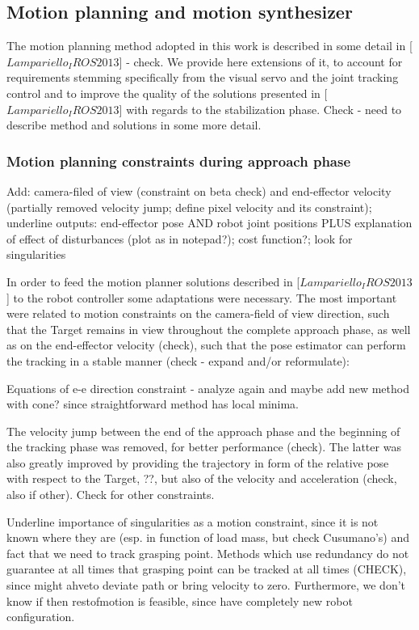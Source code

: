 \subsection{Motion planning and motion synthesizer}
%
The motion planning method adopted in this work is described in some detail in [$Lampariello_IROS2013$] - check. We provide here extensions of it, to account for requirements stemming specifically from the visual servo and the joint tracking control and to improve the quality of the solutions presented in [$Lampariello_IROS2013$] with regards to the stabilization phase. Check - need to describe method and solutions in some more detail.

\subsubsection{Motion planning constraints during approach phase}
%

Add: camera-filed of view (constraint on beta check) and end-effector velocity (partially removed velocity jump; define pixel velocity and its constraint); underline outputs: end-effector pose AND robot joint positions PLUS explanation of effect of disturbances (plot as in notepad?); cost function?; look for singularities

In order to feed the motion planner solutions described in [$Lampariello_IROS2013$] to the robot controller some adaptations were necessary. The most important were related to motion constraints on the camera-field of view direction, such that the Target remains in view throughout the complete approach phase, as well as on the end-effector velocity (check), such that the pose estimator can perform the tracking in a stable manner (check - expand and/or reformulate):

Equations of e-e direction constraint - analyze again and maybe add new method with cone? since straightforward method has local minima.

The velocity jump between the end of the approach phase and the beginning of the tracking phase was removed, for better performance (check). The latter was also greatly improved by providing the trajectory in form of the relative pose with respect to the Target, ??, but also of the velocity and acceleration (check, also if other). Check for other constraints.

Underline importance of singularities as a motion constraint, since it is not known where they are (esp. in function of load mass, but check Cusumano's) and fact that we need to track grasping point. Methods which use redundancy do not guarantee at all times that grasping point can be tracked at all times (CHECK), since might ahveto deviate path or bring velocity to zero. Furthermore, we don't know if then restofmotion is feasible, since have completely new robot configuration.

